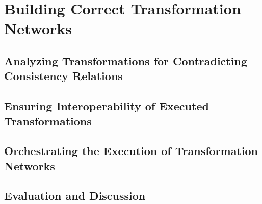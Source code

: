 \part{Building Correct Transformation Networks }
\chapter{Analyzing Transformations for Contradicting Consistency Relations }
\chapter{Ensuring Interoperability of Executed Transformations }
\chapter{Orchestrating the Execution of Transformation Networks }
\chapter{Evaluation and Discussion }